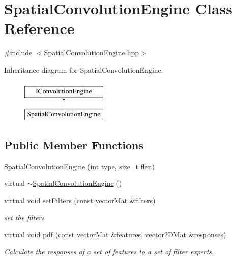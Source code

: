 \hypertarget{classSpatialConvolutionEngine}{\section{\-Spatial\-Convolution\-Engine \-Class \-Reference}
\label{classSpatialConvolutionEngine}
}


{\ttfamily \#include $<$\-Spatial\-Convolution\-Engine.\-hpp$>$}

\-Inheritance diagram for \-Spatial\-Convolution\-Engine\-:\begin{figure}[H]
\begin{center}
\leavevmode
\includegraphics[height=2.000000cm]{classSpatialConvolutionEngine}
\end{center}
\end{figure}
\subsection*{\-Public \-Member \-Functions}
\begin{DoxyCompactItemize}
\item 
\hyperlink{classSpatialConvolutionEngine_a934e9613ba487297befd6e064bbd5d7a}{\-Spatial\-Convolution\-Engine} (int type, size\-\_\-t flen)
\item 
virtual \hyperlink{classSpatialConvolutionEngine_a07b28be0c28a1c47bc6f2a7459155802}{$\sim$\-Spatial\-Convolution\-Engine} ()
\item 
virtual void \hyperlink{classSpatialConvolutionEngine_ad27aad7b65dfa3ec6a617eed96c01d9c}{set\-Filters} (const \hyperlink{types_8hpp_a3207a7addcfa415d1c83622febcb1e9b}{vector\-Mat} \&filters)
\begin{DoxyCompactList}\small\item\em set the filters \end{DoxyCompactList}\item 
virtual void \hyperlink{classSpatialConvolutionEngine_a6db3b5e9428ee74e1b4e9e7f7111cad5}{pdf} (const \hyperlink{types_8hpp_a3207a7addcfa415d1c83622febcb1e9b}{vector\-Mat} \&features, \hyperlink{types_8hpp_a33cacb85be7b8df3dc0b67d5d849f4cc}{vector2\-D\-Mat} \&responses)
\begin{DoxyCompactList}\small\item\em \-Calculate the responses of a set of features to a set of filter experts. \end{DoxyCompactList}\end{DoxyCompactItemize}
